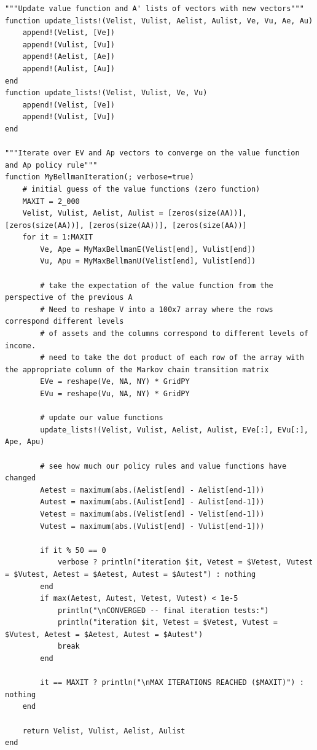 \documentclass[12pt]{article}
\begin{document}
\begin{lstlisting}[language=JuliaLocal, style=julia]
"""Update value function and A' lists of vectors with new vectors"""
function update_lists!(Velist, Vulist, Aelist, Aulist, Ve, Vu, Ae, Au)
    append!(Velist, [Ve])
    append!(Vulist, [Vu])
    append!(Aelist, [Ae])
    append!(Aulist, [Au])
end
function update_lists!(Velist, Vulist, Ve, Vu)
    append!(Velist, [Ve])
    append!(Vulist, [Vu])
end

"""Iterate over EV and Ap vectors to converge on the value function and Ap policy rule"""
function MyBellmanIteration(; verbose=true)
    # initial guess of the value functions (zero function)
    MAXIT = 2_000
    Velist, Vulist, Aelist, Aulist = [zeros(size(AA))], [zeros(size(AA))], [zeros(size(AA))], [zeros(size(AA))]
    for it = 1:MAXIT
        Ve, Ape = MyMaxBellmanE(Velist[end], Vulist[end])
        Vu, Apu = MyMaxBellmanU(Velist[end], Vulist[end])

        # take the expectation of the value function from the perspective of the previous A
        # Need to reshape V into a 100x7 array where the rows correspond different levels
        # of assets and the columns correspond to different levels of income.
        # need to take the dot product of each row of the array with the appropriate column of the Markov chain transition matrix
        EVe = reshape(Ve, NA, NY) * GridPY
        EVu = reshape(Vu, NA, NY) * GridPY

        # update our value functions
        update_lists!(Velist, Vulist, Aelist, Aulist, EVe[:], EVu[:], Ape, Apu)

        # see how much our policy rules and value functions have changed
        Aetest = maximum(abs.(Aelist[end] - Aelist[end-1]))
        Autest = maximum(abs.(Aulist[end] - Aulist[end-1]))
        Vetest = maximum(abs.(Velist[end] - Velist[end-1]))
        Vutest = maximum(abs.(Vulist[end] - Vulist[end-1]))
        
        if it % 50 == 0
            verbose ? println("iteration $it, Vetest = $Vetest, Vutest = $Vutest, Aetest = $Aetest, Autest = $Autest") : nothing
        end
        if max(Aetest, Autest, Vetest, Vutest) < 1e-5
            println("\nCONVERGED -- final iteration tests:")
            println("iteration $it, Vetest = $Vetest, Vutest = $Vutest, Aetest = $Aetest, Autest = $Autest")
            break
        end

        it == MAXIT ? println("\nMAX ITERATIONS REACHED ($MAXIT)") : nothing
    end

    return Velist, Vulist, Aelist, Aulist
end
\end{lstlisting}
\end{document}
